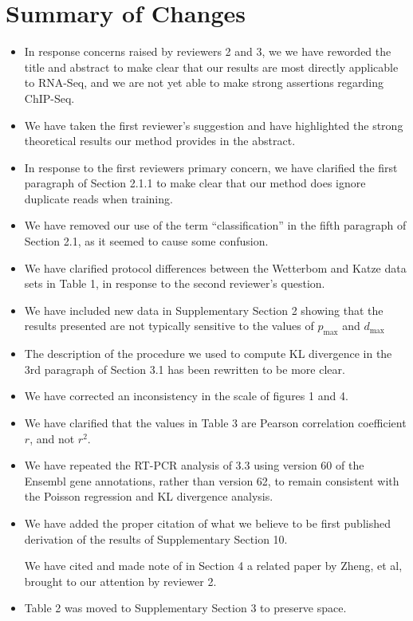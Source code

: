 \documentclass{article}
\begin{document}
\section*{Summary of Changes}

\begin{itemize}
\item In response concerns raised by reviewers 2 and 3, we we have reworded the
title and abstract to make clear that our results are most directly applicable
to RNA-Seq, and we are not yet able to make strong assertions regarding
ChIP-Seq.

\item We have taken the first reviewer's suggestion and have highlighted the
strong theoretical results our method provides in the abstract.

\item In response to the first reviewers primary concern, we have clarified the
first paragraph of Section 2.1.1 to make clear that our method does ignore
duplicate reads when training.

\item We have removed our use of the term ``classification'' in the fifth
paragraph of Section 2.1, as it seemed to cause some confusion.

\item We have clarified protocol differences between the Wetterbom and Katze
data sets in Table 1, in response to the second reviewer's question.

\item We have included new data in Supplementary Section 2 showing that the
results presented are not typically sensitive to the values of $p_{\text{max}}$
and $d_{\text{max}}$

\item The description of the procedure we used to compute KL divergence in the
3rd paragraph of Section 3.1 has been rewritten to be more clear.

\item We have corrected an inconsistency in the scale of figures 1 and 4.

\item We have clarified that the values in Table 3 are Pearson correlation
coefficient $r$, and not $r^2$.

\item We have repeated the RT-PCR analysis of 3.3 using version 60 of the
Ensembl gene annotations, rather than version 62, to remain consistent with the
Poisson regression and KL divergence analysis.

\item We have added the proper citation of what we believe to be first published
derivation of the results of Supplementary Section 10.

\time We have cited and made note of in Section 4 a related paper by Zheng, et
al, brought to our attention by reviewer 2.

\item Table 2 was moved to Supplementary Section 3 to preserve space.

\end{itemize}
\end{document}
